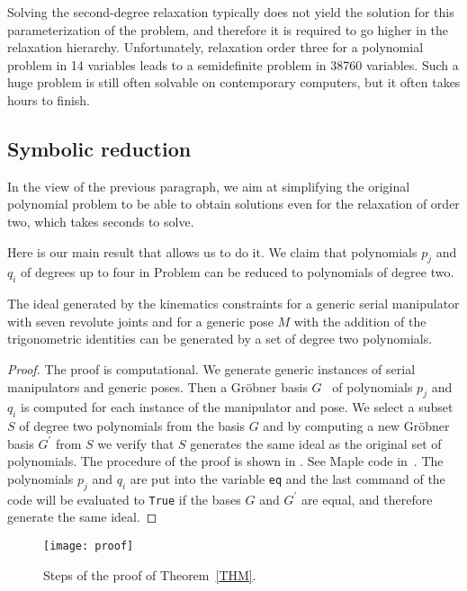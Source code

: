 Solving the second-degree relaxation typically does not yield the solution for this parameterization of the problem, and therefore it is required to go higher in the relaxation hierarchy. Unfortunately, relaxation order three for a polynomial problem in 14 variables leads to a semidefinite problem in \num{38760} variables. Such a huge problem is still often solvable on contemporary computers, but it often takes hours to finish.

\subsection{Symbolic reduction}
In the view of the previous paragraph, we aim at simplifying the original polynomial problem to be able to obtain solutions even for the relaxation of order two, which takes seconds to solve.

Here is our main result that allows us to do it. We claim that polynomials $p_j$ and $q_i$ of degrees up to four in Problem  can be reduced to polynomials of degree two.
\begin{theorem}\label{THM}
  The ideal generated by the kinematics constraints  for a generic serial manipulator with seven revolute joints and for a generic pose $M$ with the addition of the trigonometric identities  can be generated by a set of degree two polynomials.
\end{theorem}
\begin{proof}
  The proof is computational.
  We generate generic instances of serial manipulators and generic poses.
  Then a Gr\"obner basis $G$~\cite{Cox-Little-Shea2015} of polynomials $p_j$ and $q_i$ is computed for each instance of the manipulator and pose.
  We select a subset $S$ of degree two polynomials from the basis $G$ and by computing a new Gr\"obner basis $G^\prime$ from $S$ we verify that $S$ generates the same ideal as the original set of polynomials.
  The procedure of the proof is shown in .
  See Maple code in~. The polynomials $p_j$ and $q_i$ are put into the variable \texttt{eq} and the last command of the code will be evaluated to \texttt{True} if the bases $G$ and $G^\prime$ are equal, and therefore generate the same ideal.
  
\end{proof}

\begin{figure}[ht]
  \centering
  \texttt{[image: proof]}
  \caption{Steps of the proof of Theorem~\ref{THM}.}
\end{figure}

